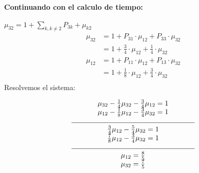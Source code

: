 \documentclass{templateNote}
\begin{document}
\textbf{Continuando con el calculo de tiempo:}

$\mu_{32} = 1+ \sum_{k,k\neq2}^{} P_{3k} + \mu_{k2}$
\begin{align*}
    \mu_{32} &= 1+ P_{31} \cdot \mu_{12} + P_{33} \cdot \mu_{32}\\
            &= 1+ \frac{3}{4} \cdot \mu_{12} + \frac{1}{4} \cdot \mu_{32}\\
    \mu_{12} &= 1+ P_{11} \cdot \mu_{12} + P_{13} \cdot \mu_{32}\\
            &= 1+ \frac{1}{8} \cdot \mu_{12} + \frac{3}{4} \cdot \mu_{32}\\
\end{align*}
Resolvemos el sistema:
\begin{center}
    \begin{align*}
        \begin{array}{c}
            \mu_{32} - \frac{1}{4} \mu_{32} - \frac{3}{4} \mu_{12} = 1 \\
            \mu_{12} - \frac{1}{8} \mu_{12} - \frac{3}{4} \mu_{32} = 1 \\
            \rule{0.5\linewidth}{0.4pt} \\
            \frac{3}{4} \mu_{12} - \frac{5}{4} \mu_{32} = 1 \\
            \frac{7}{8} \mu_{12} - \frac{3}{4} \mu_{32} = 1 \\
            \rule{0.5\linewidth}{0.4pt} \\
            \mu_{12} = \frac{8}{5} \\
            \mu_{32} = \frac{7}{5} \\
        \end{array}
    \end{align*}
\end{center}
\end{document}
